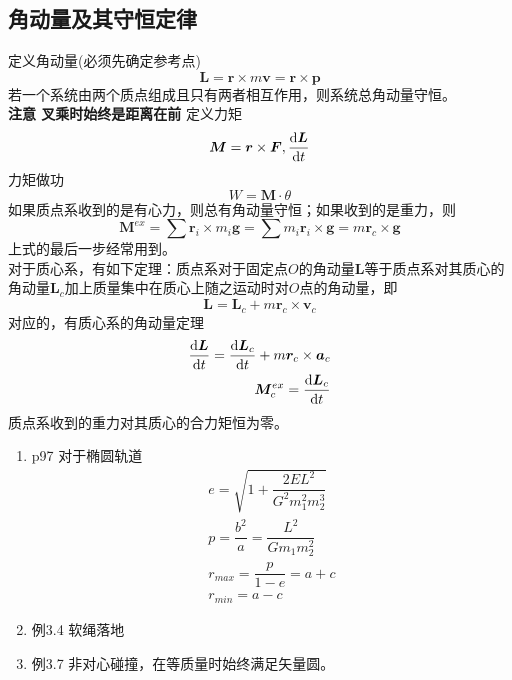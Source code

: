 \subsection{角动量及其守恒定律}
定义角动量(必须先确定参考点)
\begin{equation}\label{key}
	\bm{L}=\bm{r}\times m \bm{v}=\bm{r}\times  \bm{p}
\end{equation}
若一个系统由两个质点组成且只有两者相互作用，则系统总角动量守恒。\\
\textbf{注意 叉乘时始终是距离在前}
定义力矩
\begin{equation}\label{key}
	\bm{M}=\bm{r}\times \bm{F},\dfrac{\mathrm{d} \bm{L}}{\mathrm{d} t}
\end{equation}
力矩做功
\begin{equation}\label{key}
	W=\bm{M}\cdot \theta
\end{equation}
如果质点系收到的是有心力，则总有角动量守恒；如果收到的是重力，则
\begin{equation}\label{key}
	\bm{M}^{ex}=\sum \bm{r}_i\times m_i\bm{g}=\sum m_i\bm{r}_i\times \bm{g}=m\bm{r}_c\times \bm{g}
\end{equation}
上式的最后一步经常用到。\\
对于质心系，有如下定理：质点系对于固定点$O$的角动量$\bm{L}$等于质点系对其质心的角动量$\bm{L}_c$加上质量集中在质心上随之运动时对$O$点的角动量，即
\begin{equation}\label{key}
	\bm{L}=\bm{L}_c+m\bm{r}_c\times \bm{v}_c
\end{equation}
对应的，有质心系的角动量定理
\begin{align}\label{key}
	\dfrac{\mathrm{d} \bm{L}}{\mathrm{d} t}=\dfrac{\mathrm{d} \bm{L}_c}{\mathrm{d} t}+m\bm{r}_c\times \bm{a}_c\\
	\bm{M}_c^{ex}=\dfrac{\mathrm{d} \bm{L}_c}{\mathrm{d} t}
\end{align}
质点系收到的重力对其质心的合力矩恒为零。

\begin{enumerate}
	\item p97 对于椭圆轨道
	\begin{align}\label{key}
		e=\sqrt{1+\dfrac{2EL^2}{G^2m_1^2m_2^3}}\\
		p=\dfrac{b^2}{a}=\dfrac{L^2}{Gm_1m_2^2}\\
		r_{max}=\dfrac{p}{1-e}=a+c\\
		r_{min}=a-c
	\end{align}
\item 例3.4 软绳落地
\item 例3.7 非对心碰撞，在等质量时始终满足矢量圆。
\end{enumerate}
